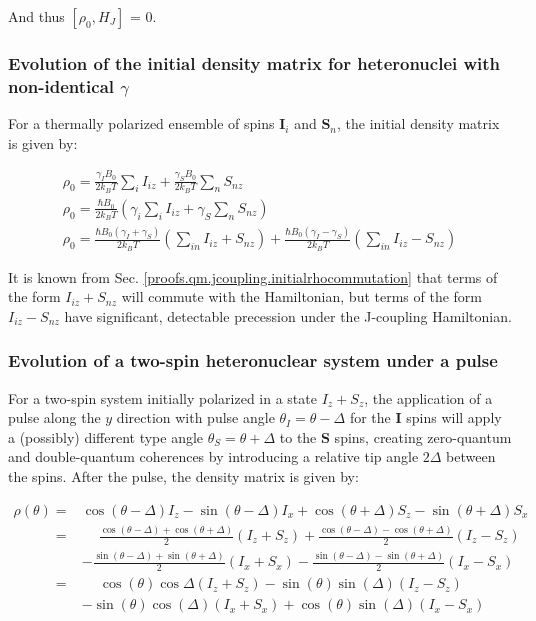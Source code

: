 \documentclass[../PaulGanssle-Thesis.tex]{subfiles}
\begin{document}
And thus $\left[\rho_{0}, H_{J}\right]$ = 0.

\subsubsection{Evolution of the initial density matrix for heteronuclei with non-identical $\gamma$}
\label{proofs.qm.jcoupling.densitymatheteronuclei}
For a thermally polarized ensemble of spins $\mathbf{I}_{i}$ and $\mathbf{S}_{n}$, the initial density matrix is given by:

\begin{gather}
\rho_{0}  = \frac{\gamma_{I}B_0}{2k_{B}T}\sum_{i}I_{iz} + \frac{\gamma_{S}B_{0}}{2k_{B}T}\sum_{n}S_{nz} \\
\rho_0 = \frac{\hbar B_{0}}{2k_{B}T}\left(\gamma_{i}\sum_{i}I_{iz} + \gamma_{S}\sum_{n}S_{nz}\right) \\
\rho_0 = \frac{\hbar B_{0}(\gamma_{I}+\gamma_{S})}{2k_{B}T}\left(\sum_{in}I_{iz} + S_{nz}\right) + \frac{\hbar B_{0}(\gamma_{I}-\gamma_{S})}{2k_{B}T}\left(\sum_{in}I_{iz} - S_{nz}\right)
\end{gather}

It is known from Sec. \ref{proofs.qm.jcoupling.initialrhocommutation} that terms of the form $I_{iz} + S_{nz}$ will commute with the Hamiltonian, but terms of the form $I_{iz} - S_{nz}$ have significant, detectable precession under the J-coupling Hamiltonian.

\subsubsection{Evolution of a two-spin heteronuclear system under a pulse}
\label{proofs.qm.jcoupling.pulseapplied}
For a two-spin system initially polarized in a state $I_{z} + S_{z}$, the application of a pulse along the $y$ direction with pulse angle $\theta_{I} = \theta - \Delta$ for the $\mathbf{I}$ spins will apply a (possibly) different type angle $\theta_{S} = \theta + \Delta$ to the $\mathbf{S}$ spins, creating zero-quantum and double-quantum coherences by introducing a relative tip angle $2\Delta$ between the spins. After the pulse, the density matrix is given by:

\begin{align}
\rho(\theta) = & \cos(\theta - \Delta)I_{z} - \sin(\theta - \Delta)I_{x} + \cos(\theta + \Delta)S_{z} - \sin(\theta + \Delta)S_{x} \\
\phantom{\rho(\theta)} = & \phantom{-}\frac{\cos(\theta - \Delta) + \cos(\theta + \Delta)}{2}(I_{z} + S_{z}) + \frac{\cos(\theta - \Delta) - \cos(\theta + \Delta)}{2}(I_{z} - S_{z}) \\ 
& - \frac{\sin(\theta - \Delta) + \sin(\theta + \Delta)}{2}(I_{x} + S_{x}) - \frac{\sin(\theta - \Delta) - \sin(\theta + \Delta)}{2}(I_{x} - S_{x}) \\
\phantom{\rho(\theta)} = & \phantom{-}\cos(\theta)\cos{\Delta}(I_{z} + S_{z}) - \sin(\theta)\sin(\Delta)(I_{z} - S_{z}) \\
& - \sin(\theta)\cos(\Delta)(I_{x} + S_{x}) + \cos(\theta)\sin(\Delta)(I_{x} - S_{x}) 
\end{align}
\end{document}
